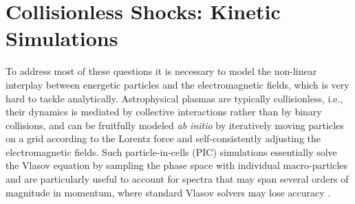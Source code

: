 \documentclass[varenna]{cimento}
\newcommand{\esh}{E_{\rm sh}}
\begin{document}
\section{Collisionless Shocks: Kinetic Simulations}  \label{sec:sims}

To address most of these questions it is necessary to model the non-linear interplay between energetic particles and the electromagnetic fields, which is very hard to tackle analytically. 
Astrophysical plasmas are typically collisionless, i.e., their dynamics is mediated by collective interactions rather than by binary collisions, and can be fruitfully modeled \emph{ab initio} by iteratively moving particles on a grid according to the Lorentz force and self-consistently adjusting the electromagnetic fields.  
Such particle-in-cells (PIC) simulations essentially solve the Vlasov equation by sampling the phase space with individual macro-particles and are particularly useful to account for spectra that may span several orders of magnitude in momentum, where standard Vlasov solvers may lose accuracy \cite{palmroth+18,juno20}.
\end{document}
